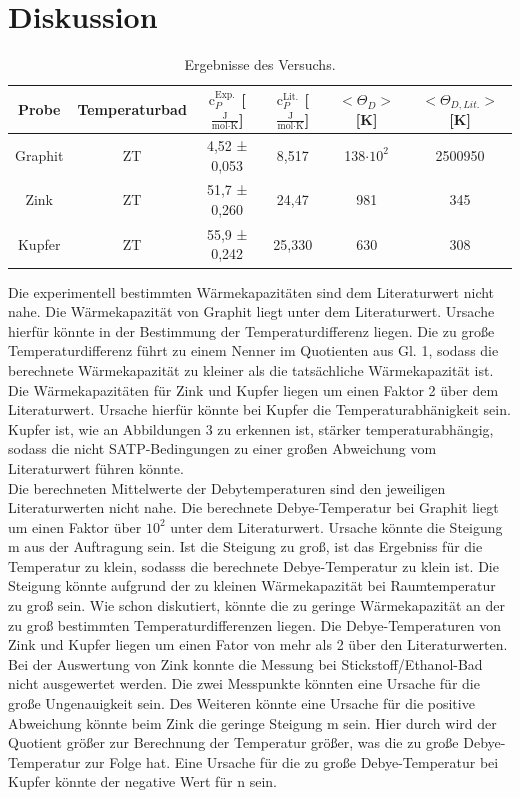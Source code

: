 \documentclass[12pt,a4paper,titlepage,headinclude,bibtotoc]{scrartcl}
\begin{document}
\section{Diskussion}
\begin{table}[h!]
\centering
\caption{Ergebnisse des Versuchs.}
\begin{tabular}{c|c|c|c||c|c}
Probe&Temperaturbad&$\text{c}_P^{\text{Exp.}}$ [$\frac{\text{J}}{\text{mol}\cdot\text{K}}$] &$\text{c}_P^{\text{Lit.}}$ [$\frac{\text{J}}{\text{mol}\cdot\text{K}}$] & $<\Theta_D >$ [K]& $<\Theta_{D,Lit.}>$ [K] \\
\hline
Graphit& ZT&4,52 ± 0,053  &8,517& 138$ \cdot 10^2$& 2500950\\
\hline
Zink &ZT& 51,7 ± 0,260 &24,47& 981 & 345\\
\hline
Kupfer &ZT&55,9 ± 0,242 &25,330& 630 &308\\
\end{tabular}
\end{table}
\FloatBarrier
Die experimentell bestimmten Wärmekapazitäten sind dem Literaturwert nicht nahe. Die Wärmekapazität von Graphit liegt unter dem Literaturwert. Ursache hierfür könnte in der Bestimmung der Temperaturdifferenz liegen. Die zu große Temperaturdifferenz führt zu einem Nenner im Quotienten aus Gl. 1, sodass die berechnete Wärmekapazität zu kleiner als die tatsächliche Wärmekapazität ist. Die Wärmekapazitäten für Zink und Kupfer liegen um einen Faktor 2 über dem Literaturwert. Ursache hierfür könnte bei Kupfer die Temperaturabhänigkeit sein. Kupfer ist, wie an Abbildungen 3 zu erkennen ist, stärker temperaturabhängig, sodass die nicht SATP-Bedingungen zu einer großen Abweichung vom Literaturwert führen könnte. \\
Die berechneten Mittelwerte der Debytemperaturen sind den jeweiligen Literaturwerten nicht nahe. Die berechnete Debye-Temperatur bei Graphit liegt um einen Faktor über $10^2$ unter dem Literaturwert. Ursache könnte die Steigung m aus der Auftragung sein. Ist die Steigung zu groß, ist das Ergebniss für die Temperatur zu klein, sodasss die berechnete Debye-Temperatur zu klein ist. Die Steigung könnte aufgrund der zu kleinen Wärmekapazität bei Raumtemperatur zu groß sein. Wie schon diskutiert, könnte die zu geringe Wärmekapazität an der zu groß bestimmten Temperaturdifferenzen liegen. Die Debye-Temperaturen von Zink und Kupfer liegen um einen Fator von mehr als 2 über den Literaturwerten. Bei der Auswertung von Zink konnte die Messung bei Stickstoff/Ethanol-Bad nicht ausgewertet werden. Die zwei Messpunkte könnten eine Ursache für die große Ungenauigkeit sein. Des Weiteren könnte eine Ursache für die positive Abweichung könnte beim Zink die geringe Steigung m sein. Hier durch wird der Quotient größer zur Berechnung der Temperatur größer, was die zu große Debye-Temperatur zur Folge hat.
Eine Ursache für die zu große Debye-Temperatur bei Kupfer könnte der negative Wert für n sein. 
\end{document}
